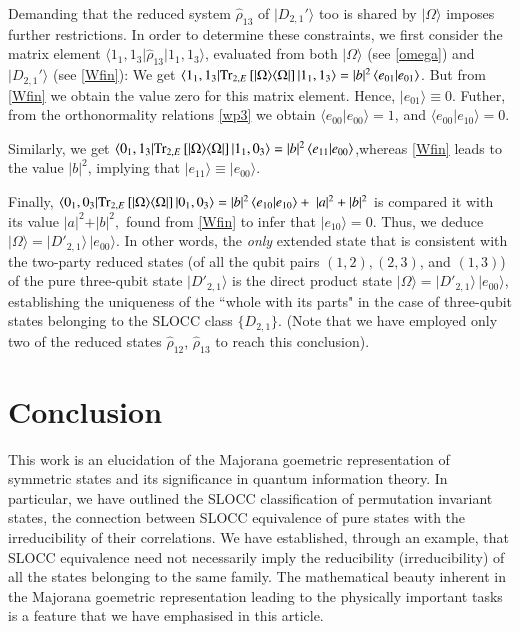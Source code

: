 Demanding that the reduced system $\hat{\rho}_{13}$ of $\vert D_{2,1}'\rangle$  too is shared by $\vert \Omega\rangle$ imposes further restrictions. In order to determine these constraints, we first consider the matrix element $\langle 1_1,1_3\vert\hat{\rho}_{13}\vert 1_1,1_3\rangle$, evaluated from both $\vert\Omega\rangle$ (see \eqref{omega}) and $\vert D_{2,1}'\rangle$  (see \eqref{Wfin}): We get $\langle 1_1,1_3\vert{\rm Tr}_{2,E}\, [\vert\Omega\rangle\langle\Omega\vert]\, \vert 1_1,1_3\rangle=\vert b\vert ^2\, \langle e_{01}\vert e_{01}\rangle$. But  from \eqref{Wfin} we obtain  the value zero for this matrix element. Hence, $\vert e_{01}\rangle\equiv 0$. Futher, from the orthonormality relations \eqref{wp3} we obtain $\langle e_{00}\vert e_{00}\rangle=1$, and $\langle e_{00}\vert e_{10}\rangle=0$. 

Similarly, we get $\langle 0_1,1_3\vert{\rm Tr}_{2,E}\, [\vert\Omega\rangle\langle\Omega\vert]\, \vert 1_1,0_3\rangle=\vert b\vert^2\, \langle e_{11}\vert e_{00}\rangle$,\break  whereas  \eqref{Wfin} leads to the value $\vert b\vert^2$, implying that $\vert e_{11}\rangle\equiv \vert e_{00}\rangle$. 
 
Finally, $\langle 0_1,0_3\vert{\rm Tr}_{2,E}\, [\vert\Omega\rangle\langle\Omega\vert]\, \vert 0_1,0_3\rangle=\vert b\vert^2\, \langle e_{10}\vert e_{10}\rangle+ \ \vert a\vert^2 +\vert b\vert^2$ is  compared it with its value $\vert a\vert^2+\vert b\vert^2,$  found  from \eqref{Wfin} to infer that  $\vert e_{10}\rangle=0$. Thus, we deduce $\vert\Omega\rangle=\vert D'_{2,1}\rangle\, \vert e_{00}\rangle$. In other words, the {\em only} extended state  that is consistent with the two-party reduced states (of all the qubit pairs $(1,2), (2,3)$, and $(1,3)$)  of the pure three-qubit state $\vert D'_{2,1}\rangle$ is the direct product state $\vert\Omega\rangle=\vert D'_{2,1}\rangle\, \vert e_{00}\rangle$,  establishing  the uniqueness of the ``whole with its parts" in the case of three-qubit states belonging to the SLOCC class $\{D_{2,1}\}$. (Note that we have employed only two  of the reduced states $\hat{\rho}_{12}$, $\hat{\rho}_{13}$ to reach this conclusion).

\section{Conclusion}

This work is an elucidation of the Majorana goemetric representation of symmetric states and its significance in quantum information theory. In particular, we have outlined the SLOCC classification of permutation invariant states, the connection between SLOCC equivalence of pure states with the irreducibility \cite{SP1,SP2,SP2b} of their correlations. We have established, through an example, that SLOCC equivalence need not necessarily imply the reducibility (irreducibility) of all the states belonging to the same family. The  mathematical beauty inherent in the Majorana goemetric representation leading to the physically important tasks is a feature that we have emphasised in this article. 


